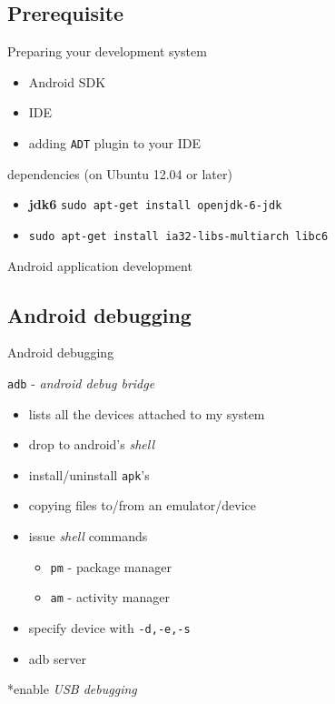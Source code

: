 \documentclass{beamer}
\begin{document}
 \subsection{Prerequisite}
 \begin{frame}{Preparing your development system}
   \begin{block}{}
     \begin{itemize}
       \item Android SDK
       \item IDE
       \item adding {\tt ADT} plugin to your IDE
     \end{itemize}
   \end{block}

   \begin{block}{dependencies (on Ubuntu 12.04 or later)}
     \begin{itemize}
     \item {\bf jdk6} {\tt sudo apt-get install openjdk-6-jdk} \pause
     \item {\tt sudo apt-get install ia32-libs-multiarch libc6}
     \end{itemize}
   \end{block}
 \end{frame}

\begin{frame}
   \centerline{Android application development}
\end{frame}

 \subsection{Android debugging}
 \begin{frame}{Android debugging}
   \begin{block}{{\tt adb} - {\em android debug bridge}}
     \begin{itemize} \pause
       \item lists all the devices attached to my system\pause
       \item drop to android's {\em shell} \pause
       \item install/uninstall {\tt apk}'s \pause
       \item copying files to/from an emulator/device \pause
       \item issue {\em shell} commands \pause
         \begin{itemize}
         \item {\tt pm} - package manager 
         \item {\tt am} - activity manager
         \end{itemize} \pause
       \item specify device with {\tt -d,-e,-s} \pause
       \item adb server
     \end{itemize}
   \end{block}
   \pause
   *enable {\em USB debugging}
 \end{frame}
\end{document}
